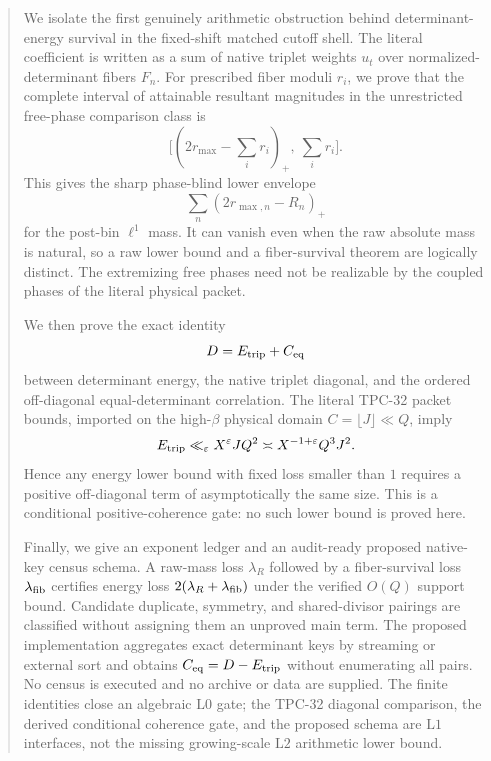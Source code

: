 \begin{abstract}
We isolate the first genuinely arithmetic obstruction behind
determinant-energy survival in the fixed-shift matched cutoff shell.
The literal coefficient is written as a sum of native triplet weights
\(u_t\) over normalized-determinant fibers \(F_n\).  For prescribed
fiber moduli \(r_i\), we prove that the complete interval of attainable
resultant magnitudes in the unrestricted free-phase comparison class
is
\[
 \bigl[(2r_{\max}-\sum_i r_i)_+,\ \sum_i r_i\bigr].
\]
This gives the sharp phase-blind lower envelope
\[
 \sum_n(2r_{\max,n}-R_n)_+
\]
for the post-bin \(\ell^1\) mass.  It can vanish even when the raw
absolute mass is natural, so a raw lower bound and a fiber-survival
theorem are logically distinct.  The extremizing free phases need not
be realizable by the coupled phases of the literal physical packet.

We then prove the exact identity
\[
 D=E_{\rm trip}+C_{\rm eq}
\]
between determinant energy, the native triplet diagonal, and the
ordered off-diagonal equal-determinant correlation.  The literal
TPC-32 packet bounds, imported on the high-\(\beta\) physical domain
\(C=\lfloor J\rfloor\ll Q\), imply
\[
 E_{\rm trip}\ll_\varepsilon X^\varepsilon JQ^2
 \asymp X^{-1+\varepsilon}Q^3J^2.
\]
Hence any energy lower bound with fixed loss smaller than \(1\)
requires a positive off-diagonal term of asymptotically the same size.
This is a conditional positive-coherence gate: no such lower bound is
proved here.

Finally, we give an exponent ledger and an audit-ready proposed
native-key census schema.  A raw-mass loss \(\lambda_R\) followed by a
fiber-survival loss \(\lambda_{\rm fib}\) certifies energy loss
\(2(\lambda_R+\lambda_{\rm fib})\) under the verified \(O(Q)\) support
bound.  Candidate duplicate, symmetry, and shared-divisor pairings are
classified without assigning them an unproved main term.  The
proposed implementation aggregates exact determinant keys by
streaming or external sort and obtains
\(C_{\rm eq}=D-E_{\rm trip}\) without enumerating all pairs.  No
census is executed and no archive or data are supplied.  The finite
identities close an algebraic \(\mathrm{L0}\) gate; the TPC-32
diagonal comparison, the derived conditional coherence gate, and the
proposed schema are \(\mathrm{L1}\) interfaces, not the missing
growing-scale \(\mathrm{L2}\) arithmetic lower bound.
\end{abstract}
